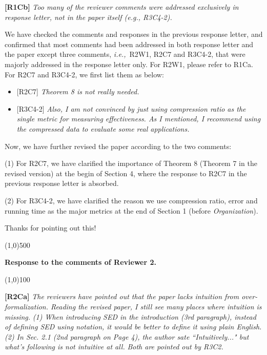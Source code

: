 \documentclass{letter}
\newcommand{\ie}{\emph{i.e.,}\xspace}
\begin{document}
\textbf{[R1Cb]} \emph{Too many of the reviewer comments were addressed exclusively in response letter, not in the paper itself (e.g., {R3C4-2}).}

We have checked the comments and responses in the previous response letter, and confirmed that most comments had been addressed in both response letter and the paper except three comments, \ie~{R2W1}, {R2C7} and {R3C4-2}, that were majorly addressed in the response letter only. For R2W1, please refer to R1Ca. For R2C7 and R3C4-2, we first list them as below:
\begin{itemize}

  \item {{[R2C7]} \emph{Theorem 8 is not really needed.}}

  \item {{[R3C4-2]} \emph{Also, I am not convinced by just using compression ratio as the single metric for measuring effectiveness. As I mentioned, I recommend using the compressed data to evaluate some real applications.}
}
\end{itemize}

Now, we have further revised the paper according to the two comments:

(1) For {R2C7}, we have clarified the importance of Theorem 8 (Theorem 7 in the revised version) at the begin of Section 4, where the response to R2C7 in the previous response letter is absorbed.

(2) For {R3C4-2}, we have clarified the reason we use compression ratio, error and running time as the major metrics at the end of Section 1 (before \emph{Organization}).

Thanks for pointing out this!





\line(1,0){500}

\textbf{Response to the comments of Reviewer 2.}

\line(1,0){100}


\textbf{[R2Ca]} \emph{The reviewers have pointed out that the paper lacks intuition from over-formalization. Reading the revised paper, I still see many places where intuition is missing.}
\emph{(1) When introducing SED in the introduction (3rd paragraph), instead of defining SED using notation, it would be better to define it using plain English.}
\emph{(2) In Sec. 2.1 (2nd paragraph on Page 4), the author sate ``Intuitively..." but what's following is not intuitive at all.}
\emph{Both are pointed out by {R3C2}.}
\end{document}
